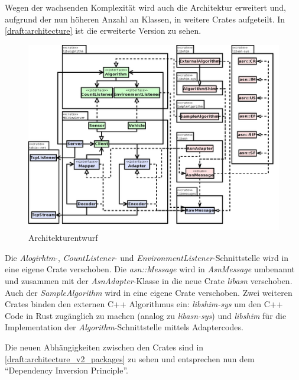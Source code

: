 Wegen der wachsenden Komplexität wird auch die Architektur erweitert und, aufgrund der nun höheren Anzahl an Klassen, in weitere Crates aufgeteilt.
In \autoref{draft:architecture} ist die erweiterte Version zu sehen.

\begin{figure}[H]
	\centering
	\includegraphics[width=3.3\textwidth]{dia/architecture_v2}
	\caption{Architekturentwurf}
	\label{draft:architecture_v2}
\end{figure}

Die \textit{Alogirhtm}-, \textit{CountListener}- und \textit{EnvironmentListener}-Schnittstelle wird in eine eigene Crate verschoben.
Die \textit{asn::Message} wird in \textit{AsnMessage} umbenannt und zusammen mit der \textit{AsnAdapter}-Klasse in die neue Crate \textit{libasn} verschoben.
Auch der \textit{SampleAlgorithm} wird in eine eigene Crate verschoben.
Zwei weiteren Crates binden den externen C++ Algorithmus ein: \textit{libshim-sys} um den C++ Code in Rust zugänglich zu machen (analog zu \textit{libasn-sys}) und \textit{libshim} für die Implementation der \textit{Algorithm}-Schnittstelle mittels Adaptercodes.

Die neuen Abhängigkeiten zwischen den Crates sind in \autoref{draft:architecture_v2_packages} zu sehen und entsprechen nun dem \enquote{Dependency Inversion Principle}. 

